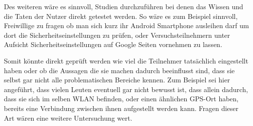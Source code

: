 Des weiteren wäre es sinnvoll, Studien durchzuführen bei denen das Wissen und die Taten der Nutzer direkt getestet werden. So wäre es zum Beispiel sinnvoll, Freiwillige zu fragen ob man sich kurz ihr Android Smartphone ausleihen darf um dort die Sicherheitseinstellungen zu prüfen, oder Versuchsteilnehmern unter Aufsicht Sicherheitseinstellungen auf Google Seiten vornehmen zu lassen.

Somit könnte direkt geprüft werden wie viel die Teilnehmer tatsächlich eingestellt haben oder ob die Aussagen die sie machen dadurch beeinflusst sind, dass sie selbst gar nicht alle problematischen Bereiche kennen. Zum Beispiel sei hier angeführt, dass vielen Leuten eventuell gar nicht bewusst ist, dass allein dadurch, dass sie sich im selben WLAN befinden, oder einen ähnlichen GPS-Ort haben, bereits eine Verbindung zwischen ihnen aufgestellt werden kann. Fragen dieser Art wären eine weitere Untersuchung wert.

